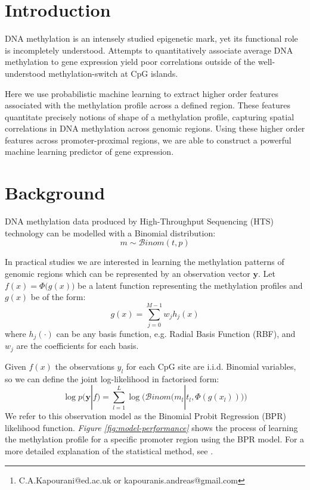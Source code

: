 \documentclass{article}\usepackage[]{graphicx}\usepackage[usenames,dvipsnames]{color}
\author{Chantriolnt-Andreas Kapourani\footnote{C.A.Kapourani@ed.ac.uk or kapouranis.andreas@gmail.com}}
\date{Modified: 1 August, 2016. Compiled: \today}
\begin{document}
\maketitle

\tableofcontents


\section{Introduction}
DNA methylation is an intensely studied epigenetic mark, yet its functional role is incompletely understood. Attempts to quantitatively associate average DNA methylation to gene expression yield poor correlations outside of the well-understood methylation-switch at CpG islands.

Here we use probabilistic machine learning to extract higher order features associated with the methylation profile across a defined region. These features quantitate precisely notions of shape of a methylation profile, capturing spatial correlations in DNA methylation across genomic regions.  Using these higher order features across promoter-proximal regions, we are able to construct a powerful machine learning predictor of gene expression.


\section{Background}
DNA methylation data produced by High-Throughput Sequencing (HTS) technology can be modelled with a Binomial distribution:
\begin{equation}
  m \sim \mathcal{B}inom(t, p)
\end{equation}

In practical studies we are interested in learning the methylation patterns of genomic regions which can be represented by an observation vector $\mathbf{y}$. Let $f(x) = \Phi \big(g(x)\big)$ be a latent function representing the methylation profiles and $g(x)$ be of the form:
\begin{equation}\label{eq-basis}
	 g(x) = \sum\limits_{j=0}^{M-1} w_{j} h_{j}(x)
\end{equation}
where $h_{j}(\cdot)$ can be any basis function, e.g. Radial Basis Function (RBF), and $w_{j}$ are the coefficients for each basis.

Given $f(x)$ the observations $y_{l}$ for each CpG site are i.i.d. Binomial variables, so we can define the joint log-likelihood in factorised form:
\begin{equation} \label{eq:bpr-likelihood}
 \log p(\mathbf{y} | f) = \sum\limits_{l = 1}^{L} \log \bigg( \mathcal{B}inom\big(m_{l} | t_{l}, \Phi(g(x_{l}))\big) \bigg)
\end{equation}
We refer to this observation model as the Binomial Probit Regression (BPR) likelihood function. \emph{Figure \ref{fig:model-performance}} shows the process of learning the methylation profile for a specific promoter region using the BPR model. For a more detailed explanation of the statistical method, see \cite{Kapourani2016}.
\end{document}
